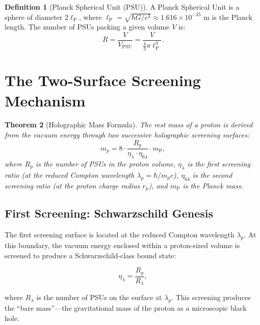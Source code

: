 \documentclass[12pt, a4paper]{article}
\theoremstyle{plain}
\newtheorem{theorem}{Theorem}[section]
\theoremstyle{definition}
\newtheorem{definition}[theorem]{Definition}
\theoremstyle{remark}
\newcommand{\lP}{\ell_{\mathrm{P}}}
\newcommand{\mP}{m_{\mathrm{P}}}
\newcommand{\rp}{r_p}
\begin{document}
\begin{definition}[Planck Spherical Unit (PSU)]\label{def:psu}
  A Planck Spherical Unit is a sphere of diameter $2\lP$, where
  $\lP = \sqrt{\hbar G / c^3} \approx 1.616 \times 10^{-35}$ m is the
  Planck length. The number of PSUs packing a given volume $V$ is:
  \begin{equation}
    R = \frac{V}{V_{\text{PSU}}} = \frac{V}{\frac{4}{3}\pi \lP^3}.
  \end{equation}
\end{definition}

\section{The Two-Surface Screening Mechanism}\label{sec:screening}

\begin{theorem}[Holographic Mass Formula]\label{thm:holographic_mass}
  The rest mass of a proton is derived from the vacuum energy through two
  successive holographic screening surfaces:
  \begin{equation}\label{eq:mass}
    m_p = 8 \cdot \frac{R_p}{\eta_\lambda \cdot \eta_{64}} \cdot \mP,
  \end{equation}
  where $R_p$ is the number of PSUs in the proton volume, $\eta_\lambda$
  is the first screening ratio (at the reduced Compton wavelength
  $\lambda_p = \hbar / m_p c$), $\eta_{64}$ is the second screening ratio
  (at the proton charge radius $\rp$), and $\mP$ is the Planck mass.
\end{theorem}

\subsection{First Screening: Schwarzschild Genesis}

The first screening surface is located at the reduced Compton wavelength
$\lambda_p$. At this boundary, the vacuum energy enclosed within a proton-sized
volume is screened to produce a Schwarzschild-class bound state:

\begin{equation}
  \eta_\lambda = \frac{R_p}{R_{\lambda}},
\end{equation}

where $R_\lambda$ is the number of PSUs on the surface at $\lambda_p$.
This screening produces the ``bare mass''---the gravitational mass of the
proton as a microscopic black hole.
\end{document}
